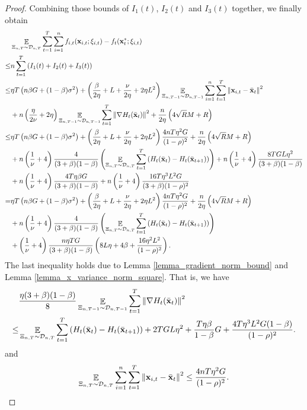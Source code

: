 \documentclass{article}
\begin{document}
\begin{proof}
Combining those bounds of $I_1(t)$, $I_2(t)$ and $I_3(t)$ together, we finally obtain
\begin{align}
\nonumber
& \mathop{\mathbb{E}}_{ \Xi_{n,T} \sim \mathcal{D}_{n,T} } \sum_{t=1}^T\sum_{i=1}^n f_{i,t}({\bf x}_{i,t};\xi_{i,t}) - f_t({\bf x}_t^\ast;\xi_{i,t}) \\ \nonumber
\le & n \sum_{t=1}^T \left(  I_1(t) + I_2(t) + I_3(t)  \right) \\ \nonumber
\le & \eta T \left(  n\beta G + (1-\beta)\sigma^2 \right) + \left( \frac{\beta}{2\eta } +L + \frac{\nu}{2\eta} + 2\eta L^2  \right) \mathop{\mathbb{E}}_{ \Xi_{n,T-1} \sim \mathcal{D}_{n,T-1} }\sum_{i=1}^n \sum_{t=1}^T \left\lVert{\bf x}_{i,t} - \bar{{\bf x}}_t\right\rVert^2  \\ \nonumber
& + n\left(  \frac{\eta}{2\nu} + 2\eta  \right)\mathop{\mathbb{E}}_{ \Xi_{n,T-1} \sim \mathcal{D}_{n,T-1} }\sum_{t=1}^T\left\lVert\nabla H_t(\bar{{\bf x}}_t)\right\rVert^2  + \frac{n}{2\eta}\left(  4\sqrt{R}M + R   \right) \\ \nonumber
\le & \eta T \left(  n\beta G + (1-\beta)\sigma^2 \right) + \left( \frac{\beta}{2\eta } +L + \frac{\nu}{2\eta} + 2\eta L^2  \right) \frac{4nT\eta^2G}{(1-\rho)^2} + \frac{n}{2\eta}\left(  4\sqrt{R}M + R   \right) \\ \nonumber
& + n\left(  \frac{1}{\nu} + 4  \right) \frac{4}{(3+\beta)(1-\beta)}\left(  \mathop{\mathbb{E}}_{ \Xi_{n,T} \sim \mathcal{D}_{n,T} } \sum_{t=1}^T \left( H_t(\bar{{\bf x}}_t) - H_t(\bar{{\bf x}}_{t+1}) \right)  \right) +  n\left(  \frac{1}{\nu} + 4  \right) \frac{8TGL\eta^2}{(3+\beta)(1-\beta)}   \\ \nonumber
& + n\left(  \frac{1}{\nu} + 4  \right) \frac{4T\eta \beta G}{(3+\beta)(1-\beta)} + n\left(  \frac{1}{\nu} + 4  \right) \frac{16T\eta^3L^2G}{(3+\beta)(1-\rho)^2} \\ \nonumber
= & \eta T \left(  n\beta G + (1-\beta)\sigma^2 \right) + \left( \frac{\beta}{2\eta } +L + \frac{\nu}{2\eta} + 2\eta L^2  \right) \frac{4nT\eta^2G}{(1-\rho)^2} + \frac{n}{2\eta}\left(  4\sqrt{R}M + R   \right) \\ \nonumber
& + n\left(  \frac{1}{\nu} + 4  \right) \frac{4}{(3+\beta)(1-\beta)}\left(  \mathop{\mathbb{E}}_{ \Xi_{n,T} \sim \mathcal{D}_{n,T} } \sum_{t=1}^T \left( H_t(\bar{{\bf x}}_t) - H_t(\bar{{\bf x}}_{t+1}) \right)  \right)  \\ \nonumber
& + \left(  \frac{1}{\nu} + 4  \right) \frac{n\eta TG}{(3+\beta)(1-\beta)} \left(  8L\eta + 4\beta + \frac{16\eta^2L^2}{(1-\rho)^2}  \right).
\end{align}  
The last inequality holds due to Lemma \ref{lemma_gradient_norm_bound} and Lemma \ref{lemma_x_variance_norm_square}. That is, we have
\begin{align}
\nonumber
& \frac{\eta(3+\beta)(1-\beta)}{8}  \mathop{\mathbb{E}}_{ \Xi_{n,T-1} \sim \mathcal{D}_{n,T-1} }\sum_{t=1}^T\left\lVert\nabla H_t(\bar{{\bf x}}_t)\right\rVert^2 \\ \nonumber
\le & \mathop{\mathbb{E}}_{ \Xi_{n,T} \sim \mathcal{D}_{n,T} } \sum_{t=1}^T \left( H_t(\bar{{\bf x}}_t) - H_t(\bar{{\bf x}}_{t+1}) \right)  + 2TGL\eta^2  + \frac{T\eta \beta}{1-\beta}  G  + \frac{4T\eta^3 L^2 G(1-\beta)}{(1-\rho)^2}.
\end{align} and
\begin{align}
\nonumber
\mathop{\mathbb{E}}_{ \Xi_{n,T} \sim \mathcal{D}_{n,T} } \sum_{i=1}^n\sum_{t=1}^T \left\lVert{\bf x}_{i,t} - \bar{{\bf x}}_t\right\rVert^2 \le \frac{4nT\eta^2 G }{(1-\rho)^2}.
\end{align}


\end{proof}
\end{document}
